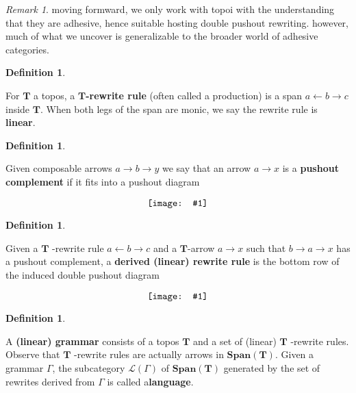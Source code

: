 \documentclass{amsart}
\newcommand{\defn}[1]{\textbf{#1}}
\newcommand{\cat}[1]{\mathbf{#1}}
\newcommand{\diagram}[1]{\raisebox{-0.5\height}{\texttt{[image: \#1]}}}
\newcommand{\Span}{\mathbf{Span}}
\theoremstyle{remark}
\newtheorem{remark}[theorem]{Remark}
\theoremstyle{definition}
\newtheorem{definition}[theorem]{Definition}
\begin{document}
\begin{remark}

  moving formward, we only work with topoi with the understanding that
  they are adhesive, hence suitable hosting double pushout rewriting.
  however, much of what we uncover is generalizable to the broader
  world of adhesive categories.
  
\end{remark}


\begin{definition}
\label{df:dpo_rewrite-rule} 
	
  For $ \cat{T} $ a topos, a \defn{$ \cat{T} $-rewrite rule}
  (often called a production) is a span $ a \gets b \to c $ inside
  $ \cat{T} $.  When both legs of the span are monic, we say the rewrite
  rule is \defn{linear}.
  
\end{definition}	

\begin{definition}
\label{df_rw_pushout-complement} 
	
  Given composable arrows $ a \to b \to y $ we say that an arrow
  $ a \to x $ is a \defn{pushout complement} if it fits into a pushout
  diagram
  \[
    \diagram{diag_rw_pushout-comp}
  \]
  
\end{definition}

\begin{definition}
\label{df:dpo_derived-rewrite-rule} 
	
  Given a \( \cat{T} \) -rewrite rule \( a \gets b \to c \) and a
  $ \cat{T} $-arrow $ a \to x $ such that $ b \to a \to x $ has a 
  pushout complement, a \defn{derived (linear) rewrite rule} is the
  bottom row of the induced double pushout diagram 
  \[ 
    \diagram{diag_rw_derived-rule}
  \]
 
\end{definition}

\begin{definition}
  \label{df:dpo_grammar-and-language}

  A \defn{(linear) grammar} consists of a topos \( \cat{T} \) and a
  set of (linear) \( \cat{T} \) -rewrite rules.  Observe that
  \( \cat{T} \) -rewrite rules are actually arrows in
  $ \Span (\cat{T}) $.  Given a grammar $ \Gamma $, the subcategory
  $ \mathcal{L} ( \Gamma ) $ of $ \Span ( \cat{T} ) $ generated by the
  set of rewrites derived from $ \Gamma $ is called a\defn{language}.
  
\end{definition}
\end{document}
